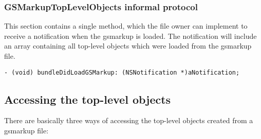 \subsubsection{GSMarkupTopLevelObjects informal protocol}
This section contains a single method, which the file owner can implement
to receive a notification when the gsmarkup is loaded.  The notification
will include an array containing all top-level objects which were loaded
from the gsmarkup file.
\begin{verbatim}
- (void) bundleDidLoadGSMarkup: (NSNotification *)aNotification;
\end{verbatim}

\subsection{Accessing the top-level objects}\label{top-level-objects}
There are basically three ways of accessing the top-level objects created
from a gsmarkup file:
